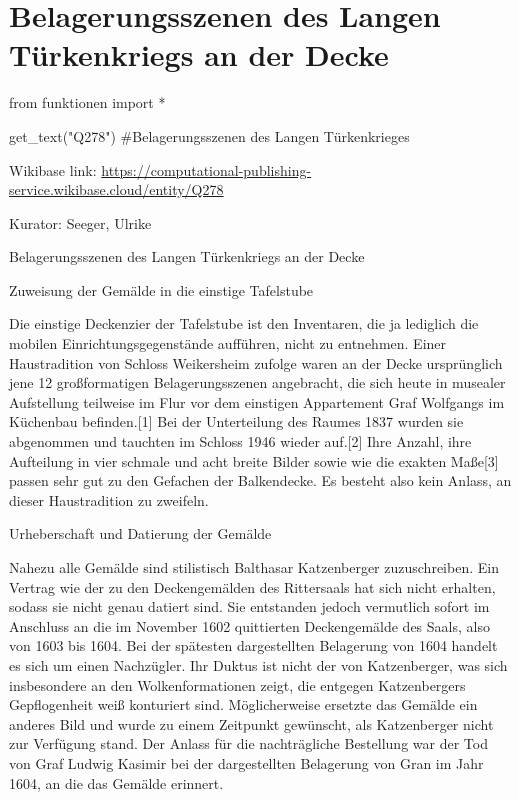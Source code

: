 \documentclass[
  a4paper,
  portrait]{book}
\newenvironment{Shaded}{\begin{snugshade}}{\end{snugshade}}
\newcommand{\CommentTok}[1]{\textcolor[rgb]{0.37,0.37,0.37}{#1}}
\newcommand{\ImportTok}[1]{\textcolor[rgb]{0.00,0.46,0.62}{#1}}
\newcommand{\NormalTok}[1]{\textcolor[rgb]{0.00,0.23,0.31}{#1}}
\newcommand{\OperatorTok}[1]{\textcolor[rgb]{0.37,0.37,0.37}{#1}}
\newcommand{\StringTok}[1]{\textcolor[rgb]{0.13,0.47,0.30}{#1}}
\begin{document}
\part{Belagerungsszenen des Langen Türkenkriegs an der Decke}

\begin{Shaded}
\begin{Highlighting}[]
\ImportTok{from}\NormalTok{ funktionen }\ImportTok{import} \OperatorTok{*}
\end{Highlighting}
\end{Shaded}

\begin{Shaded}
\begin{Highlighting}[]
\NormalTok{get\_text(}\StringTok{"Q278"}\NormalTok{)}
\CommentTok{\#Belagerungsszenen des Langen Türkenkrieges}
\end{Highlighting}
\end{Shaded}

Wikibase link:
\url{https://computational-publishing-service.wikibase.cloud/entity/Q278}

Kurator: Seeger, Ulrike

Belagerungsszenen des Langen Türkenkriegs an der Decke

Zuweisung der Gemälde in die einstige Tafelstube

Die einstige Deckenzier der Tafelstube ist den Inventaren, die ja
lediglich die mobilen Einrichtungsgegenstände aufführen, nicht zu
entnehmen. Einer Haustradition von Schloss Weikersheim zufolge waren an
der Decke ursprünglich jene 12 großformatigen Belagerungsszenen
angebracht, die sich heute in musealer Aufstellung teilweise im Flur vor
dem einstigen Appartement Graf Wolfgangs im Küchenbau befinden.{[}1{]}
Bei der Unterteilung des Raumes 1837 wurden sie abgenommen und tauchten
im Schloss 1946 wieder auf.{[}2{]} Ihre Anzahl, ihre Aufteilung in vier
schmale und acht breite Bilder sowie wie die exakten Maße{[}3{]} passen
sehr gut zu den Gefachen der Balkendecke. Es besteht also kein Anlass,
an dieser Haustradition zu zweifeln.

Urheberschaft und Datierung der Gemälde

Nahezu alle Gemälde sind stilistisch Balthasar Katzenberger
zuzuschreiben. Ein Vertrag wie der zu den Deckengemälden des Rittersaals
hat sich nicht erhalten, sodass sie nicht genau datiert sind. Sie
entstanden jedoch vermutlich sofort im Anschluss an die im November 1602
quittierten Deckengemälde des Saals, also von 1603 bis 1604. Bei der
spätesten dargestellten Belagerung von 1604 handelt es sich um einen
Nachzügler. Ihr Duktus ist nicht der von Katzenberger, was sich
insbesondere an den Wolkenformationen zeigt, die entgegen Katzenbergers
Gepflogenheit weiß konturiert sind. Möglicherweise ersetzte das Gemälde
ein anderes Bild und wurde zu einem Zeitpunkt gewünscht, als
Katzenberger nicht zur Verfügung stand. Der Anlass für die nachträgliche
Bestellung war der Tod von Graf Ludwig Kasimir bei der dargestellten
Belagerung von Gran im Jahr 1604, an die das Gemälde erinnert.
\end{document}
